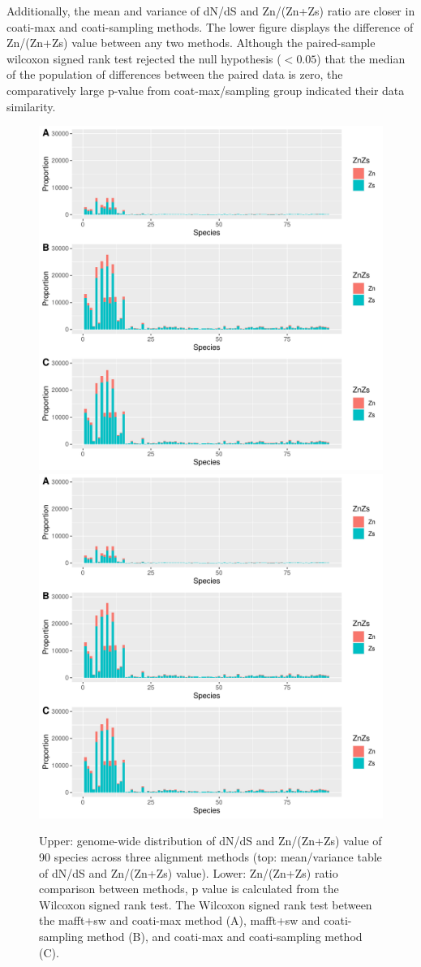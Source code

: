Additionally, the mean and variance of dN/dS and Zn/(Zn+Zs) ratio are closer in coati-max and coati-sampling methods. The lower figure displays the difference of Zn/(Zn+Zs) value between any two methods. Although the paired-sample wilcoxon signed rank test rejected the null hypothesis ($<0.05$) that the median of the population of differences between the paired data is zero, the comparatively large p-value from coat-max/sampling group indicated their data similarity. 
\newpage
\begin{figure}[H]
    \vspace*{-0.5in}
     \centering
     \begin{minipage}[t]{1\textwidth}
     \centering
     \includegraphics[page=2,width=0.7\linewidth,height=0.6\linewidth]{Fig6.pdf}
     \includegraphics[page=3,width=0.7\linewidth,height=0.6\linewidth]{Fig6.pdf}
     { {Upper: genome-wide distribution of dN/dS and Zn/(Zn+Zs) value of 90 species across three alignment methods (top: mean/variance table of dN/dS and Zn/(Zn+Zs) value). Lower: Zn/(Zn+Zs) ratio comparison between methods, p value is calculated from the Wilcoxon signed rank test. The Wilcoxon signed rank test between the mafft+sw and coati-max method (A), mafft+sw and coati-sampling method (B), and coati-max and coati-sampling method (C). }
     \par}
     \end{minipage}
\end{figure}

